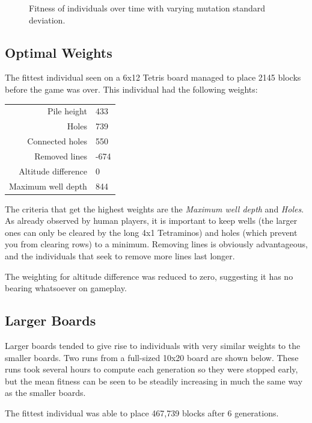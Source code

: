 \documentclass[a4paper,12pt]{article}
\begin{document}
\begin{landscape}
\begin{figure}[p]
    \caption{Fitness of individuals over time with varying mutation standard
        deviation.}
    \label{StdDev}
  \end{figure}
\end{landscape}

\subsection{Optimal Weights}

The fittest individual seen on a 6x12 Tetris board managed to place 2145 blocks
before the game was over.
This individual had the following weights:

\begin{center}
  \begin{tabular}{r|l}
    Pile height & 433 \\
    Holes & 739 \\
    Connected holes & 550 \\
    Removed lines & -674 \\
    Altitude difference & 0 \\
    Maximum well depth & 844
  \end{tabular}
\end{center}

The criteria that get the highest weights are the \emph{Maximum well depth} and
\emph{Holes}.
As already observed by human players, it is important to keep wells (the larger
ones can only be cleared by the long 4x1 Tetraminos) and holes (which prevent
you from clearing rows) to a minimum.
Removing lines is obviously advantageous, and the individuals that seek to
remove more lines last longer.

The weighting for altitude difference was reduced to zero, suggesting it has
no bearing whatsoever on gameplay.

\subsection{Larger Boards}

Larger boards tended to give rise to individuals with very similar weights
to the smaller boards.
Two runs from a full-sized 10x20 board are shown below.
These runs took several hours to compute each generation so they were stopped
early, but the mean fitness can be seen to be steadily increasing in much the
same way as the smaller boards.

The fittest individual was able to place 467,739 blocks after 6 generations.
\end{document}
